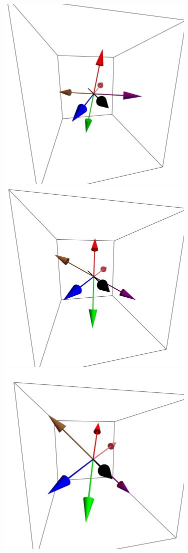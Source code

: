 \documentclass{article}
\begin{document}
\begin{figure}[ht]
\centering
\includegraphics[scale=0.22]{HVariedData/Pictures/010Inc1.png}
\includegraphics[scale=0.22]{HVariedData/Pictures/010Inc111.png}
\includegraphics[scale=0.22]{HVariedData/Pictures/010Inc118.png}

\end{figure}
\end{document}
